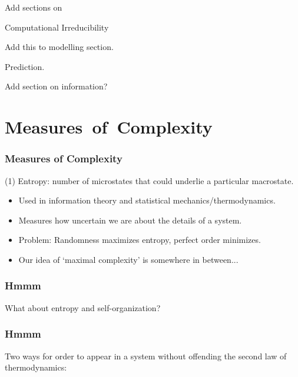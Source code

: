Add sections on

Computational Irreducibility

Add this to modelling section.

Prediction.

Add section on information?

\section{Measures\ of\ Complexity}

\begin{frame}
  \frametitle{Measures of Complexity}


  \medskip

  (1) \alert{Entropy}: number of microstates that could underlie
  a particular macrostate.

  \medskip

  \begin{itemize}
  \item<1-> Used in information theory and statistical mechanics/thermodynamics.
  \item<2-> Measures how uncertain we are about the details of a system.
  \item<3-> Problem: Randomness maximizes entropy, perfect order minimizes.
  \item<4->Our idea of `maximal complexity' is somewhere in between...
  \end{itemize}

\end{frame}

\begin{frame}
  \frametitle{Hmmm}


  \bigskip

  What about entropy and self-organization?

  \bigskip


\end{frame}

\begin{frame}
  \frametitle{Hmmm}

  Two ways for order to appear in a system
  without offending the second law of
  thermodynamics:

  \bigskip


  \bigskip


\end{frame}

